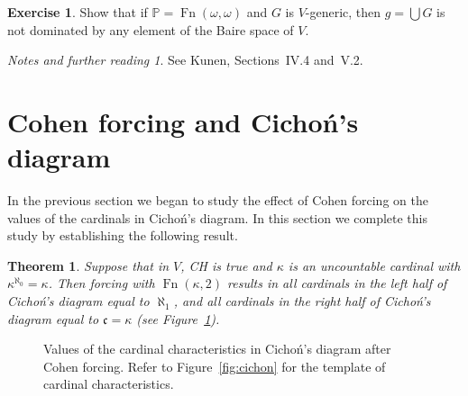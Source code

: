 \documentclass[11pt,oneside]{amsbook}
\newcommand{\PP}{\mathbb P}
\DeclareMathOperator{\Fn}{Fn}
\theoremstyle{definition}
\newtheorem{exercise}{Exercise}[section]
\theoremstyle{plain}
\newtheorem{theorem}{Theorem}[section]
\theoremstyle{definition}
\theoremstyle{remark}
\newtheorem*{notes}{Notes and further reading}
\numberwithin{equation}{section}
\numberwithin{figure}{section}
\begin{document}
\begin{exercise}
  \label{exerc:cohen-nondom}
  Show that if $\PP=\Fn(\omega,\omega)$ and $G$ is $V$-generic, then $g=\bigcup G$ is not dominated by any element of the Baire space of $V$.
\end{exercise}

\begin{notes}
  See Kunen, Sections~IV.4 and~V.2.
\end{notes}

\newpage
\section{Cohen forcing and Cicho\'n's diagram}

In the previous section we began to study the effect of Cohen forcing on the values of the cardinals in Cicho\'n's diagram. In this section we complete this study by establishing the following result.

\begin{theorem}
  \label{thm:cohen-cichon}
  Suppose that in $V$, CH is true and $\kappa$ is an uncountable cardinal with $\kappa^{\aleph_0}=\kappa$. Then forcing with $\Fn(\kappa,2)$ results in all cardinals in the left half of Cicho\'n's diagram equal to $\aleph_1$, and all cardinals in the right half of Cicho\'n's diagram equal to $\mathfrak c=\kappa$ (see Figure~\ref{fig:cichon-cohen}).
\end{theorem}


\begin{figure}[h]
  \caption{Values of the cardinal characteristics in Cicho\'n's diagram after Cohen forcing. Refer to Figure~\ref{fig:cichon} for the template of cardinal characteristics.\label{fig:cichon-cohen}}
\end{figure}
\end{document}
